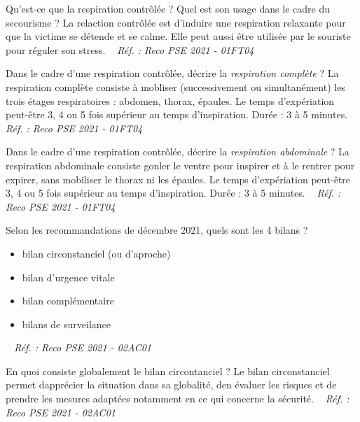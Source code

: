 \documentclass[grid,avery5371,landscape]{flashcards}
\makeatletter
\newcounter{nocarte}
\newcommand{\categ}[1]{%
  \def\@categ{#1}%
  \setcounter{nocarte}{0}%
}
\newcommand{\source}[1]{%
  \medskip
  \itshape%
   ~ \hfill Réf. : #1}
\makeatother
\begin{document}
\color[HTML]{003273}
\categ{PSE}
\begin{flashcard}[geste]{
 Qu'est-ce que la respiration contrôlée ? Quel est son usage dans le cadre du secourisme ?   }
  La relaction contrôlée est d'induire une respiration relaxante pour que la victime se détende et se calme. Elle peut aussi être utilisée par le souriste pour réguler son stress.
  \source{Reco PSE 2021 - 01FT04}
\end{flashcard}


\color[HTML]{003273}
\categ{PSE}
\begin{flashcard}[geste]{
 Dans le cadre d'une respiration contrôlée, décrire la \emph{respiration complète} ?   }
  La respiration complète consiste à mobliser (successivement ou simultanément) les trois étages respiratoires : abdomen, thorax, épaules.
Le temps d'expériation peut-être 3, 4 ou 5 fois supérieur au temps d'inspiration. 
Durée : 3 à 5 minutes.
  \source{Reco PSE 2021 - 01FT04}
\end{flashcard}


\color[HTML]{003273}
\categ{PSE}
\begin{flashcard}[geste]{
 Dans le cadre d'une respiration contrôlée, décrire la \emph{respiration abdominale} ?   }
  La respiration abdominale consiste gonler le ventre pour inspirer et à le rentrer pour expirer, sans mobiliser le thorax ni les épaules.
Le temps d'expériation peut-être 3, 4 ou 5 fois supérieur au temps d'inspiration. 
Durée : 3 à 5 minutes.
  \source{Reco PSE 2021 - 01FT04}
\end{flashcard}


\color[HTML]{003273}
\categ{PSE}
\begin{flashcard}[bilan]{
 Selon les recommandations de décembre 2021, quels sont les 4 bilans ?   }
  \begin{itemize} \item bilan circonstanciel (ou d'aproche) \item bilan d'urgence vitale \item bilan complémentaire \item bilans de surveilance \end{itemize}
  \source{Reco PSE 2021 - 02AC01}
\end{flashcard}


\color[HTML]{003273}
\categ{PSE}
\begin{flashcard}[bilan]{
 En quoi consiste globalement le bilan circontanciel ?   }
  Le bilan circonstanciel permet dapprécier la situation dans sa globalité, den évaluer les risques et de prendre les mesures adaptées notamment en ce qui concerne la sécurité.
  \source{Reco PSE 2021 - 02AC01}
\end{flashcard}
\end{document}
